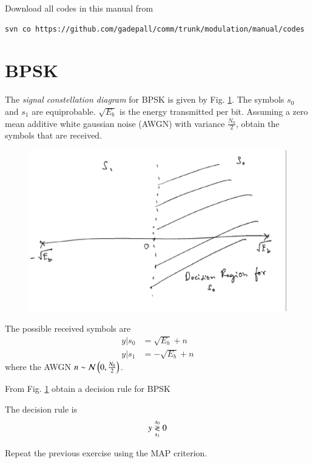 \documentclass[journal,12pt,twocolumn]{IEEEtran}
\begin{document}
Download all codes in this manual from 
\begin{lstlisting}
svn co https://github.com/gadepall/comm/trunk/modulation/manual/codes
\end{lstlisting}

\section{BPSK}
\begin{problem}
The {\em signal constellation diagram} for BPSK is given by Fig. \ref{fig:bpsk_const}.  The symbols $s_0$ and $s_1$ are equiprobable.  $\sqrt{E_b}$ is the energy transmitted per bit. Assuming a zero mean additive white gaussian noise (AWGN) with variance $\frac{N_0}{2}$,
obtain the symbols that are received.
\end{problem}
%
\begin{figure}[!h]
\centering
\includegraphics[width=\columnwidth]{./figs/bpsk_const.eps}
\caption{}
\label{fig:bpsk_const}
\end{figure}
\solution The possible received symbols are
\begin{align}
y|s_0 &= \sqrt{E_b} + n
\\
y|s_1 &= -\sqrt{E_b} + n
\end{align}
%
where the AWGN $n \sim \mathcal{N}\left(0,\frac{N_0}{2}\right)$.
%
\begin{problem}
\label{prob:bpsk_decision}
From Fig. \ref{fig:bpsk_const} obtain a decision rule for BPSK
\end{problem}
\solution The decision rule is
\begin{equation}
y \overset{s_0}{\underset{s_1}{\gtrless}} 0
\end{equation}
\begin{problem}
Repeat the previous exercise using the MAP criterion.
\end{problem}
\end{document}
